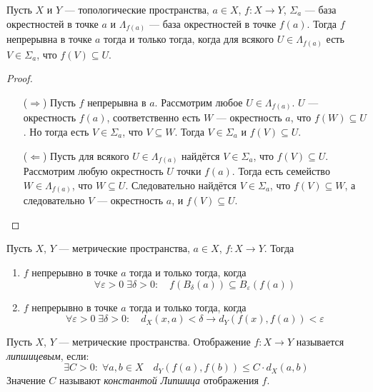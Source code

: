 \documentclass[12pt,a4paper]{article}
\begin{document}
    \begin{theorem}
        Пусть $X$ и $Y$ --- топологические пространства, $a \in X$, $f: X \to Y$, $\Sigma_a$ --- база окрестностей в точке $a$ и $\Lambda_{f(a)}$ --- база окрестностей в точке $f(a)$. Тогда $f$ непрерывна в точке $a$ тогда и только тогда, когда для всякого $U \in \Lambda_{f(a)}$ есть $V \in \Sigma_a$, что $f(V) \subseteq U$.
    \end{theorem}

    \begin{proof}\ 
        \begin{itemize}
            \item[($\Rightarrow$)] Пусть $f$ непрерывна в $a$. Рассмотрим любое $U \in \Lambda_{f(a)}$. $U$ --- окрестность $f(a)$, соответственно есть $W$ --- окрестность $a$, что $f(W) \subseteq U$. Но тогда есть $V \in \Sigma_a$, что $V \subseteq W$. Тогда $V \in \Sigma_a$ и $f(V) \subseteq U$.
            \item[($\Leftarrow$)] Пусть для всякого $U \in \Lambda_{f(a)}$ найдётся $V \in \Sigma_a$, что $f(V) \subseteq U$. Рассмотрим любую окрестность $U$ точки $f(a)$. Тогда есть семейство $W \in \Lambda_{f(a)}$, что $W \subseteq U$. Следовательно найдётся $V \in \Sigma_a$, что $f(V) \subseteq W$, а следовательно $V$ --- окрестность $a$, и $f(V) \subseteq U$.
        \end{itemize}
    \end{proof}

    \begin{corollary}
        Пусть $X$, $Y$ --- метрические пространства, $a \in X$, $f: X \to Y$. Тогда
        \begin{enumerate}
            \item $f$ непрерывно в точке $a$ тогда и только тогда, когда
                \[\forall \varepsilon > 0\; \exists \delta > 0:\quad f(B_\delta(a)) \subseteq B_\varepsilon(f(a))\]
            \item $f$ непрерывно в точке $a$ тогда и только тогда, когда
                \[\forall \varepsilon > 0\; \exists \delta > 0:\quad d_X(x, a) < \delta \rightarrow d_Y(f(x), f(a)) < \varepsilon\]
        \end{enumerate}
    \end{corollary}

    \begin{definition}
        Пусть $X$, $Y$ --- метрические пространства. Отображение $f: X \to Y$ называется \emph{липшицевым}, если:
        \[\exists C > 0:\; \forall a, b \in X\quad d_Y(f(a), f(b)) \leqslant C \cdot d_X(a, b)\]
        Значение $C$ называют \emph{константой Липшица} отображения $f$.
    \end{definition}
\end{document}
